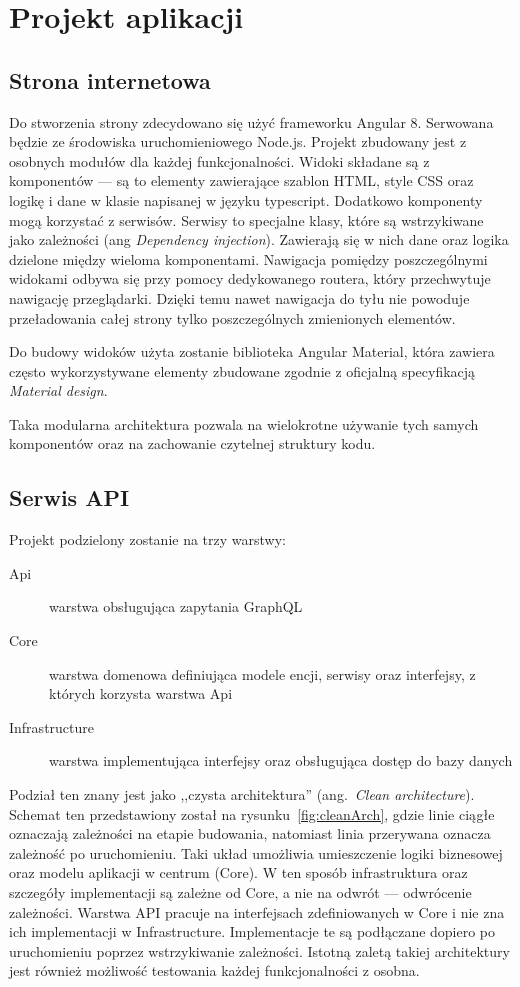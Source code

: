 \chapter{Projekt aplikacji}
\label{sec:projekt}

\section{Strona internetowa}
	Do stworzenia strony zdecydowano się użyć frameworku Angular 8.
	Serwowana będzie ze środowiska uruchomieniowego Node.js.
	Projekt zbudowany jest z osobnych modułów dla każdej funkcjonalności.
	Widoki składane są z komponentów --- są to elementy zawierające szablon HTML, style CSS oraz logikę i dane w klasie napisanej w języku typescript.
	Dodatkowo komponenty mogą korzystać z serwisów. Serwisy to specjalne klasy, które są wstrzykiwane jako zależności (ang \emph{Dependency injection}).
	Zawierają się w nich dane oraz logika dzielone między wieloma komponentami.
	Nawigacja pomiędzy poszczególnymi widokami odbywa się przy pomocy dedykowanego routera, który przechwytuje nawigację przeglądarki.
	Dzięki temu nawet nawigacja do tyłu nie powoduje przeładowania całej strony tylko poszczególnych zmienionych elementów.

	Do budowy widoków użyta zostanie biblioteka Angular Material,
	która zawiera często wykorzystywane elementy zbudowane zgodnie z oficjalną specyfikacją \emph{Material design}.

	Taka modularna architektura pozwala na wielokrotne używanie tych samych komponentów oraz na zachowanie czytelnej struktury kodu.

\section{Serwis API}
	Projekt podzielony zostanie na trzy warstwy:
	\begin{description}
		\item[Api] warstwa obsługująca zapytania GraphQL
		\item[Core] warstwa domenowa definiująca modele encji, serwisy oraz interfejsy, z których korzysta warstwa Api
		\item[Infrastructure] warstwa implementująca interfejsy oraz obsługująca dostęp do bazy danych
	\end{description}

	Podział ten znany jest jako ,,czysta architektura'' (ang.\ \emph{Clean architecture}).
	Schemat ten przedstawiony został na rysunku~\ref{fig:cleanArch},
	gdzie linie ciągłe oznaczają zależności na etapie budowania, natomiast linia przerywana oznacza zależność po uruchomieniu.
	Taki układ umożliwia umieszczenie logiki biznesowej oraz modelu aplikacji w centrum (Core).
	W ten sposób infrastruktura oraz szczegóły implementacji są zależne od Core, a nie na odwrót --- odwrócenie zależności.
	Warstwa API pracuje na interfejsach zdefiniowanych w Core i nie zna ich implementacji w Infrastructure.
	Implementacje te są podłączane dopiero po uruchomieniu poprzez wstrzykiwanie zależności.
	Istotną zaletą takiej architektury jest również możliwość testowania każdej funkcjonalności z osobna.

